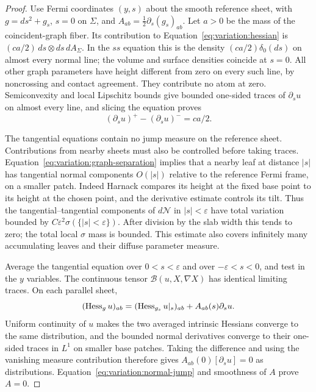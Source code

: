 \begin{proof}
Use Fermi coordinates $(y,s)$ about the smooth reference sheet, with
$g=ds^2+g_s$, $s=0$ on $\Sigma$, and
$A_{ab}=\tfrac12\partial_s(g_s)_{ab}$.  Let $a>0$ be the mass of the
coincident-graph fiber.  Its contribution to
Equation~\eqref{eq:variation:hessian} is
$(ca/2)\,ds\otimes ds\,dA_\Sigma$.
In the $ss$ equation this is the density $(ca/2)\delta_0(ds)$ on
almost every normal line; the volume and surface densities coincide
at $s=0$.  All other graph parameters have height different from zero
on every such line, by noncrossing and contact agreement.  They
contribute no atom at zero.  Semiconvexity and local Lipschitz bounds
give bounded one-sided traces of $\partial_su$ on almost every line,
and slicing the equation proves
\begin{equation}\label{eq:variation:normal-jump}
 (\partial_su)^+-(\partial_su)^-=ca/2.
\end{equation}

The tangential equations contain no jump measure on the reference
sheet.  Contributions from nearby sheets must also be controlled
before taking traces.  Equation~\eqref{eq:variation:graph-separation} implies that a nearby leaf at
distance $|s|$ has tangential normal components $O(|s|)$ relative to
the reference Fermi frame, on a smaller patch.  Indeed Harnack
compares its height at the fixed base point to its height at the
chosen point, and the derivative estimate controls its tilt.  Thus
the tangential--tangential components of $d\mathcal N$ in
$|s|<\varepsilon$ have total variation bounded by
$C\varepsilon^2\sigma(\{|s|<\varepsilon\})$.  After division by the
slab width this tends to zero; the total local $\sigma$ mass is
bounded.  This estimate also covers infinitely many accumulating
leaves and their diffuse parameter measure.

Average the tangential equation over $0<s<\varepsilon$ and over
$-\varepsilon<s<0$, and test in the $y$ variables.  The continuous
tensor $\mathcal B(u,X,\nabla X)$ has identical limiting traces.  On
each parallel sheet,
\[
 (\operatorname{Hess}_g u)_{ab}=(\operatorname{Hess}_{g_s}u|_{s})_{ab}
                              +A_{ab}(s)\partial_su.
\]
Uniform continuity of $u$ makes the two averaged intrinsic Hessians
converge to the same distribution, and the bounded normal derivatives
converge to their one-sided traces in $L^1$ on smaller base patches.
Taking the difference and using the vanishing measure contribution
therefore gives $A_{ab}(0)[\partial_su]=0$ as distributions.  Equation~\eqref{eq:variation:normal-jump} and smoothness of $A$ prove $A=0$.
\end{proof}

